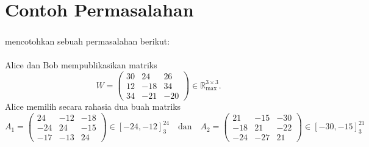 \documentclass[aspectratio=169]{beamer}
\theoremstyle{definition}
\numberwithin{definisi}{section}
\begin{document}
\section{Contoh Permasalahan}
\begin{frame}
  \frametitle{\insertsection}
  \citeauthor{ziaulhaq2023protokol} mencotohkan sebuah permasalahan berikut:\\~\\
  Alice dan Bob mempublikasikan matriks
  \[
    W =
    \begin{pmatrix}
      30 & 24  & 26  \\
      12 & -18 & 34  \\
      34 & -21 & -20
    \end{pmatrix}
    \in \mathbb{R}_{\max}^{3 \times 3}.
  \]
  Alice memilih secara rahasia dua buah matriks
  \[
    A_1 =
    \begin{pmatrix}
      24  & -12 & -18 \\
      -24 & 24  & -15 \\
      -17 & -13 & 24
    \end{pmatrix}
    \in [-24, -12]^{24}_{3}
    \quad \text{dan} \quad
    A_2 =
    \begin{pmatrix}
      21  & -15 & -30 \\
      -18 & 21  & -22 \\
      -24 & -27 & 21
    \end{pmatrix}
    \in [-30, -15]^{21}_{3}
  \]
\end{frame}
\end{document}
